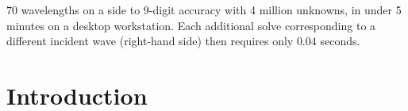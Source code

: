 \documentclass[11pt,final]{amsart}
\theoremstyle{definition}
\numberwithin{remark}{section}
\numberwithin{definition}{section}
\numberwithin{pro}{section}
\begin{document}
\begin{center}
\begin{minipage}{135mm}
$70$ wavelengths on a side to 9-digit accuracy
with 4 million unknowns, in under 5 minutes on a desktop workstation.
%
Each additional solve corresponding to a different incident wave
(right-hand side) then requires only
$0.04$ seconds. %
\end{minipage}
\end{center}

\section{Introduction}
\label{sec:intro}
\end{document}
